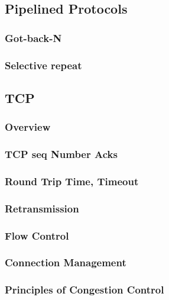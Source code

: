 \documentclass[11pt]{article}
\begin{document}
\subsection{Pipelined Protocols}
\label{sec:orgd40ee6f}
\subsubsection{Got-back-N}
\label{sec:orgfd4039e}
\subsubsection{Selective repeat}
\label{sec:org7883e53}

\subsection{TCP}
\label{sec:org7e3caf6}
\subsubsection{Overview}
\label{sec:org7ba96d4}
\subsubsection{TCP seq Number Acks}
\label{sec:org669a9e3}
\subsubsection{Round Trip Time, Timeout}
\label{sec:org59da0e4}
\subsubsection{Retransmission}
\label{sec:orgfbd1cbe}
\subsubsection{Flow Control}
\label{sec:orga31efd4}
\subsubsection{Connection Management}
\label{sec:orge4b000c}
\subsubsection{Principles of Congestion Control}
\label{sec:org93776ae}
\end{document}

